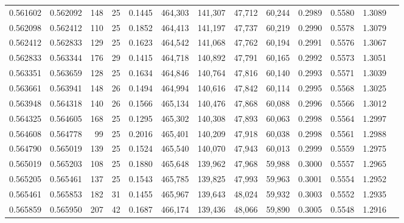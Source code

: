 \begin{tabular}{rrrrrrrrrrrrr}
0.561602 & 0.562092 &   148 &  25 &                                     0.1445 & 464,303 & 141,307 &  47,712 &  60,244 & 0.2989 & 0.5580 & 1.3089 \\
0.562098 & 0.562412 &   110 &  25 &                                     0.1852 & 464,413 & 141,197 &  47,737 &  60,219 & 0.2990 & 0.5578 & 1.3079 \\
0.562412 & 0.562833 &   129 &  25 &                                     0.1623 & 464,542 & 141,068 &  47,762 &  60,194 & 0.2991 & 0.5576 & 1.3067 \\
0.562833 & 0.563344 &   176 &  29 &                                     0.1415 & 464,718 & 140,892 &  47,791 &  60,165 & 0.2992 & 0.5573 & 1.3051 \\
0.563351 & 0.563659 &   128 &  25 &                                     0.1634 & 464,846 & 140,764 &  47,816 &  60,140 & 0.2993 & 0.5571 & 1.3039 \\
0.563661 & 0.563941 &   148 &  26 &                                     0.1494 & 464,994 & 140,616 &  47,842 &  60,114 & 0.2995 & 0.5568 & 1.3025 \\
0.563948 & 0.564318 &   140 &  26 &                                     0.1566 & 465,134 & 140,476 &  47,868 &  60,088 & 0.2996 & 0.5566 & 1.3012 \\
0.564325 & 0.564605 &   168 &  25 &                                     0.1295 & 465,302 & 140,308 &  47,893 &  60,063 & 0.2998 & 0.5564 & 1.2997 \\
0.564608 & 0.564778 &    99 &  25 &                                     0.2016 & 465,401 & 140,209 &  47,918 &  60,038 & 0.2998 & 0.5561 & 1.2988 \\
0.564790 & 0.565019 &   139 &  25 &                                     0.1524 & 465,540 & 140,070 &  47,943 &  60,013 & 0.2999 & 0.5559 & 1.2975 \\
0.565019 & 0.565203 &   108 &  25 &                                     0.1880 & 465,648 & 139,962 &  47,968 &  59,988 & 0.3000 & 0.5557 & 1.2965 \\
0.565205 & 0.565461 &   137 &  25 &                                     0.1543 & 465,785 & 139,825 &  47,993 &  59,963 & 0.3001 & 0.5554 & 1.2952 \\
0.565461 & 0.565853 &   182 &  31 &                                     0.1455 & 465,967 & 139,643 &  48,024 &  59,932 & 0.3003 & 0.5552 & 1.2935 \\
0.565859 & 0.565950 &   207 &  42 &                                     0.1687 & 466,174 & 139,436 &  48,066 &  59,890 & 0.3005 & 0.5548 & 1.2916 \\

\end{tabular}
